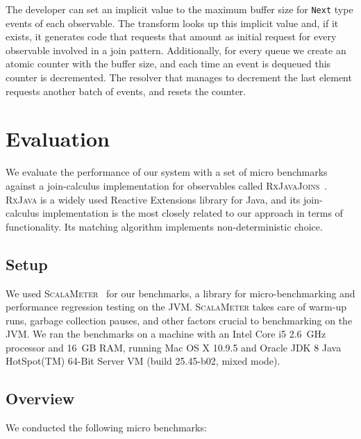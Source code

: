 \documentclass[runningheads]{llncs}
\begin{document}
\begin{sloppypar}
The developer can set an implicit value to the maximum buffer size for
\verb|Next| type events of each observable. The transform looks up this
implicit value and, if it exists, it generates code that requests that amount
as initial request for every observable involved in a join pattern.
Additionally, for every queue we create an atomic counter with the buffer
size, and each time an event is dequeued this counter is decremented. The
resolver that manages to decrement the last element requests another batch of
events, and resets the counter.


\section{Evaluation}\label{sec:evaluation}

We evaluate the performance of our system with a set of micro benchmarks
against a join-calculus implementation for observables called
\textsc{RxJavaJoins}~\cite{RxJavaJoins}. \textsc{RxJava} is a widely used
Reactive Extensions library for Java, and its join-calculus implementation is
the most closely related to our approach in terms of functionality. Its
matching algorithm implements non-deterministic choice.

\subsection{Setup}


We used \textsc{ScalaMeter}~\cite{ScalaMeter} for our benchmarks, a library
for micro-benchmarking and performance regression testing on the JVM.
\textsc{ScalaMeter} takes care of warm-up runs, garbage collection pauses, and
other factors crucial to benchmarking on the JVM. We ran the benchmarks on a
machine with an Intel Core i5 2.6~GHz processor and 16~GB RAM, running Mac OS
X 10.9.5 and Oracle JDK 8 Java HotSpot(TM) 64-Bit Server VM (build 25.45-b02,
mixed mode).

\subsection{Overview}

We conducted the following micro benchmarks:


\end{sloppypar}
\end{document}

